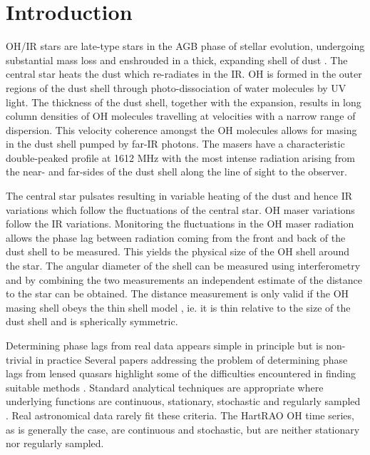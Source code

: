 \section{Introduction}
OH/IR stars are late-type stars in the AGB phase of stellar evolution, undergoing substantial mass loss and enshrouded in a thick, expanding shell of dust
\citep[][review]{WilBar68,RJC89}.
The central star heats the dust which re-radiates in the IR.
OH is formed in the outer regions of the dust shell through photo-dissociation of water molecules by UV light.
The thickness of the dust shell, together with the expansion, results in long column densities of OH molecules travelling at velocities with a narrow range of dispersion.
This velocity coherence amongst the OH molecules allows for masing in the dust shell pumped by far-IR photons.
The masers have a characteristic double-peaked profile at 1612 MHz
\citep[][review]{WilBar72,RJC89}
with the most intense radiation arising from the near- and far-sides of the dust shell along the line of sight to the observer.

The central star pulsates resulting in variable heating of the dust and hence IR variations which follow the fluctuations of the central star.
OH maser variations follow the IR variations.
Monitoring the fluctuations in the OH maser radiation allows the phase lag between radiation coming from the front and back of the dust shell to be measured.
This yields the physical size of the OH shell around the star.
The angular diameter of the shell can be measured using interferometry and by combining the two measurements an independent estimate of the distance to the star can be obtained.
The distance measurement is only valid if the OH masing shell obeys the thin shell model
\citep[][review]{ReidMMJS77,RJC89},
ie. it is thin relative to the size of the dust shell and is spherically symmetric.

Determining phase lags from real data appears simple in principle but is non-trivial in practice
Several papers addressing the problem of determining phase lags from lensed quasars highlight some of the difficulties encountered in finding suitable methods
\citep[eg.][]{PhLGil-M02,PhLOscoz01,PhLPelt96,PhLPress92,EK88}.
Standard analytical techniques are appropriate where underlying functions are continuous, stationary, stochastic and regularly sampled
\citep{Welsh99,EK88}.
Real astronomical data rarely fit these criteria.
The \mbox{HartRAO} OH time series, as is generally the case, are continuous and stochastic, but are neither stationary nor regularly sampled.

